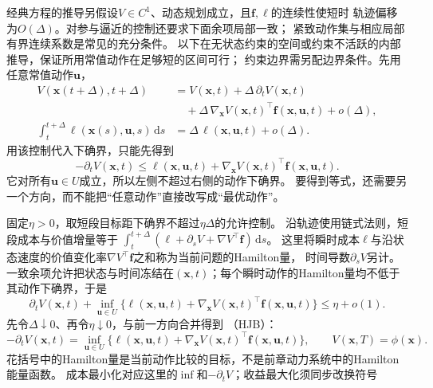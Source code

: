 经典方程的推导另假设$V\in C^1$、动态规划成立，且$\bm f,\ell$的连续性使短时
轨迹偏移为$O(\Delta)$。对参与逼近的控制还要求下面余项局部一致；
紧致动作集与相应局部有界连续系数是常见的充分条件。
以下在无状态约束的空间或约束不活跃的内部推导，保证所用常值动作在足够短的区间可行；
约束边界需另配边界条件。先用任意常值动作$\bm u$，
\begin{align*}
  V(\bm x(t+\Delta),t+\Delta)
  &=V(\bm x,t)+\Delta\,\partial_tV(\bm x,t)\\
  &\quad+\Delta\,\nabla_{\bm x}V(\bm x,t)^\top\bm f(\bm x,\bm u,t)
    +o(\Delta),\\
  \int_t^{t+\Delta}\ell(\bm x(s),\bm u,s)\,\mathrm ds
  &=\Delta\,\ell(\bm x,\bm u,t)+o(\Delta).
\end{align*}
用该控制代入下确界，只能先得到
\[
  -\partial_tV(\bm x,t)
  \leq\ell(\bm x,\bm u,t)+\nabla_{\bm x}V(\bm x,t)^\top\bm f(\bm x,\bm u,t).
\]
它对所有$\bm u\in U$成立，所以左侧不超过右侧的动作下确界。
要得到等式，还需要另一个方向，而不能把“任意动作”直接改写成“最优动作”。

固定$\eta>0$，取短段目标距下确界不超过$\eta\Delta$的允许控制。
沿轨迹使用链式法则，短段成本与价值增量等于
$\int_t^{t+\Delta}(\ell+\partial_sV+\nabla V^\top\bm f)\,\mathrm ds$。
这里将瞬时成本$\ell$与沿状态速度的价值变化率$\nabla V^\top\bm f$之和称为当前问题的Hamilton量，
时间导数$\partial_sV$另计。
一致余项允许把状态与时间冻结在$(\bm x,t)$；每个瞬时动作的Hamilton量均不低于
其动作下确界，于是
\[
  \partial_tV(\bm x,t)+
  \inf_{\bm u\in U}\{\ell(\bm x,\bm u,t)+
    \nabla_{\bm x}V(\bm x,t)^\top\bm f(\bm x,\bm u,t)\}
  \leq\eta+o(1).
\]
先令$\Delta\downarrow0$、再令$\eta\downarrow0$，与前一方向合并得到
（HJB）：
\begin{equation}
  -\partial_tV(\bm x,t)=
  \inf_{\bm u\in U}
    \{\ell(\bm x,\bm u,t)+
      \nabla_{\bm x}V(\bm x,t)^\top\bm f(\bm x,\bm u,t)\},
  \qquad V(\bm x,T)=\phi(\bm x).
  \label{eq:control-deterministic-hjb}
\end{equation}
花括号中的Hamilton量是当前动作比较的目标，不是前章动力系统中的Hamilton能量函数。
成本最小化对应这里的$\inf$和$-\partial_tV$；收益最大化须同步改换符号

